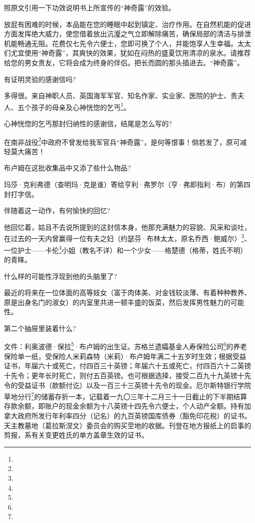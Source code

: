\par 照原文引用一下功效说明书上所宣传的“神奇露”的效验。
\par 放屁有困难的时候，本品能在您的睡眠中起到镇定、治疗作用。在自然机能的促进方面发挥绝大威力，使您借着放出沆瀣之气立即解除痛苦，确保局部的清洁与排泄机能畅通无阻。花费仅七先令六便士，您即可换了个人，并能饱享人生幸福。太太们尤宜使用“神奇露”，其爽快的效果，犹如在闷热的盛夏饮用清凉的泉水。请推荐给您的男女贵友，它将会成为终身的伴侣。把长而圆的那头插进去。“神奇露”。
\par 有证明灵验的感谢信吗?
\par 多得很。来自神职人员、英国海军军官、知名作家、实业家、医院的护士、贵夫人、五个孩子的母亲及心神恍惚的乞丐\footnote{}。
\par 心神恍惚的乞丐那封归纳性的感谢信，结尾是怎么写的?
\par 在南非战役\footnote{}中政府不曾发给我军官兵“神奇露”，是何等恨事！倘若发了，原可减轻莫大痛苦！
\par 布卢姆在这批收集品中又添了些什么物品?
\par 玛莎·克利弗德（查明玛·克是谁）寄给亨利·弗罗尔（亨·弗即指利·布）的第四封打字信。
\par 伴随着这一动作，有何愉快的回忆?
\par 他回忆着，姑且不去说所提到的这封信本身，他那充满魅力的容貌、风采和谈吐，在过去的一天内曾赢得一位有夫之妇（约瑟芬·布林太太，原名乔西·鲍威尔）\footnote{}、一位护士——卡伦\footnote{}小姐（教名不详）和一个少女——格楚德（格蒂，姓氏不明）的青睐。
\par 什么样的可能性浮现到他的头脑里了?
\par 最近的将来在一位体面的高等妓女（富于肉体美、对金钱较淡薄、有着种种教养、原是出身名门的淑女）的内室里共进一顿丰盛的饭菜，然后发挥男性魅力的可能性。
\par 第二个抽屉里装着什么?
\par 文件：利奥波德·保拉\footnote{}·布卢姆的出生证。苏格兰遗孀基金人寿保险公司\footnote{}的养老保险单一纸，受保险人米莉森特（米莉）·布卢姆年满二十五岁时生效；根据受益证书，年届六十或死亡，付四百三十英镑；年届六十五或死亡，付四百六十二英镑十先令；更年长时死亡，则付五百英镑。也可根据选择，接受二百九十九英镑十先令的受益证书（款额付讫）以及一百三十三英镑十先令的现金。厄尔斯特银行学院草地分行\footnote{}的储蓄存折一本，记载着一九〇三年十二月三十一日截止的下半期结算存款余额，即账户的现金余额为十八英镑十四先令六便士，个人动产全额。持有加拿大政府所发行年利率四分（记名）的九百英镑国库债券（豁免印花税）的证书。天主教墓地（葛拉斯涅文）委员会的购买茔地的收据。刊登在地方报纸上的启事的剪报，系有关变更姓氏的单方盖章生效的证书。
